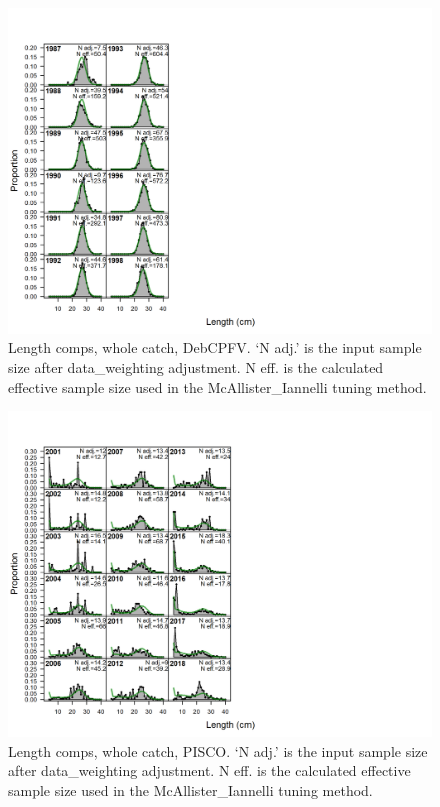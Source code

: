\documentclass[12pt,]{article}
\begin{document}
\begin{figure}
\centering
\includegraphics{./r4ss/plots_mod1/comp_lenfit_flt5mkt0.png}
\caption{Length comps, whole catch, DebCPFV. `N adj.' is the input
sample size after data\_weighting adjustment. N eff. is the calculated
effective sample size used in the McAllister\_Iannelli tuning method.
\label{fig:mod1_5_comp_lenfit_flt5mkt0}}
\end{figure}

\begin{figure}
\centering
\includegraphics{./r4ss/plots_mod1/comp_lenfit_flt8mkt0.png}
\caption{Length comps, whole catch, PISCO. `N adj.' is the input sample
size after data\_weighting adjustment. N eff. is the calculated
effective sample size used in the McAllister\_Iannelli tuning method.
\label{fig:mod1_6_comp_lenfit_flt8mkt0}}
\end{figure}
\end{document}
